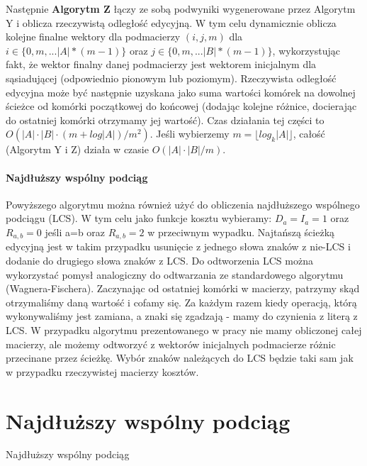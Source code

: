 Następnie \textbf{Algorytm Z} łączy ze sobą podwyniki wygenerowane przez Algorytm Y i oblicza rzeczywistą odległość edycyjną. W tym celu dynamicznie oblicza kolejne finalne wektory dla podmacierzy $(i,j,m)$ dla $i \in \{0,m,...|A|*(m-1)\}$ oraz $j \in \{0,m,...|B|*(m-1)\}$, wykorzystując fakt, że wektor finalny danej podmacierzy jest wektorem inicjalnym dla sąsiadującej (odpowiednio pionowym lub poziomym). Rzeczywista odległość edycyjna może być następnie uzyskana jako suma wartości komórek na dowolnej ścieżce od komórki początkowej do końcowej (dodając kolejne różnice, docierając do ostatniej komórki otrzymamy jej wartość). Czas działania tej części to $O(|A| \cdot |B| \cdot (m+log|A|)/m^2)$. Jeśli wybierzemy $m = \lfloor log_k|A| \rfloor$, całość (Algorytm Y i Z) działa w czasie $O(|A| \cdot |B|/m)$.

\paragraph{Najdłuższy wspólny podciąg}

Powyższego algorytmu można również użyć do obliczenia najdłuższego wspólnego podciągu (LCS). W tym celu jako funkcje kosztu wybieramy:
$D_a = I_a = 1$ oraz $R_{a,b} = 0$ jeśli a=b oraz $R_{a,b} = 2$ w przeciwnym wypadku. Najtańszą ścieżką edycyjną jest w takim przypadku usunięcie z jednego słowa znaków z nie-LCS i dodanie do drugiego słowa znaków z LCS. Do odtworzenia LCS można wykorzystać pomysł analogiczny do odtwarzania ze standardowego algorytmu (Wagnera-Fischera). Zaczynając od ostatniej komórki w macierzy, patrzymy skąd otrzymaliśmy daną wartość i cofamy się. Za każdym razem kiedy operacją, którą wykonywaliśmy jest zamiana, a znaki się zgadzają - mamy do czynienia z literą z LCS. W przypadku algorytmu prezentowanego w pracy nie mamy obliczonej całej macierzy, ale możemy odtworzyć z wektorów inicjalnych podmacierze różnic przecinane przez ścieżkę. Wybór znaków należących do LCS będzie taki sam jak w przypadku rzeczywistej macierzy kosztów.

\section{Najdłuższy wspólny podciąg}

\begin{algorithm}[H]
    \caption{Najdłuższy wspólny podciąg}
\end{algorithm}

